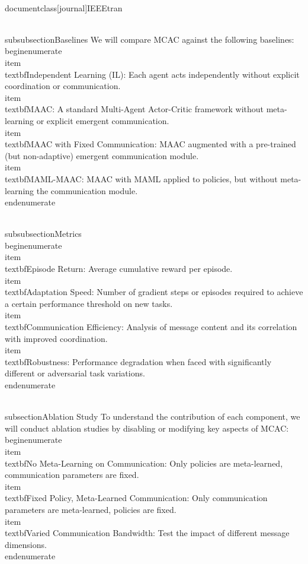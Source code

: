 \\documentclass[journal]{IEEEtran}
\begin{document}
\\subsubsection{Baselines}
We will compare MCAC against the following baselines:
\\begin{enumerate}
    \\item \\textbf{Independent Learning (IL)}: Each agent acts independently without explicit coordination or communication.
    \\item \\textbf{MAAC}: A standard Multi-Agent Actor-Critic framework without meta-learning or explicit emergent communication.
    \\item \\textbf{MAAC with Fixed Communication}: MAAC augmented with a pre-trained (but non-adaptive) emergent communication module.
    \\item \\textbf{MAML-MAAC}: MAAC with MAML applied to policies, but without meta-learning the communication module.
\\end{enumerate}

\\subsubsection{Metrics}
\\begin{enumerate}
    \\item \\textbf{Episode Return}: Average cumulative reward per episode.
    \\item \\textbf{Adaptation Speed}: Number of gradient steps or episodes required to achieve a certain performance threshold on new tasks.
    \\item \\textbf{Communication Efficiency}: Analysis of message content and its correlation with improved coordination.
    \\item \\textbf{Robustness}: Performance degradation when faced with significantly different or adversarial task variations.
\\end{enumerate}

\\subsection{Ablation Study}
To understand the contribution of each component, we will conduct ablation studies by disabling or modifying key aspects of MCAC:
\\begin{enumerate}
    \\item \\textbf{No Meta-Learning on Communication}: Only policies are meta-learned, communication parameters are fixed.
    \\item \\textbf{Fixed Policy, Meta-Learned Communication}: Only communication parameters are meta-learned, policies are fixed.
    \\item \\textbf{Varied Communication Bandwidth}: Test the impact of different message dimensions.
\\end{enumerate}
\end{document}

